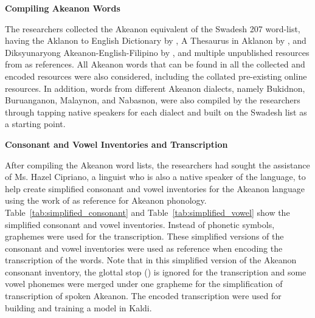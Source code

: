 \textbf{Compiling Akeanon Words}

The researchers collected the Akeanon equivalent of the Swadesh 207 word-list, having the Aklanon to English Dictionary by , A Thesaurus in Aklanon by , and Diksyunaryong Akeanon-English-Filipino by , and multiple unpublished resources from  as references. All Akeanon words that can be found in all the collected and encoded resources were also considered, including the collated pre-existing online resources. In addition, words from different Akeanon dialects, namely Bukidnon, Buruanganon, Malaynon, and Nabasnon, were also compiled by the researchers through tapping native speakers for each dialect and built on the Swadesh list as a starting point. 

\textbf{Consonant and Vowel Inventories and Transcription}

After compiling the Akeanon word lists, the researchers had sought the assistance of Ms. Hazel Cipriano, a linguist who is also a native speaker of the language, to help create simplified  consonant and vowel inventories for the Akeanon language using the work of  as reference for Akeanon phonology. Table~\ref{tab:simplified_consonant} and Table~\ref{tab:simplified_vowel} show the simplified consonant and vowel inventories. Instead of phonetic symbols, graphemes were used for the transcription. These simplified versions of the consonant and vowel inventories were used as reference when encoding the transcription of the words. Note that in this simplified version of the Akeanon consonant inventory, the glottal stop () is ignored for the transcription and some vowel phonemes were merged under one grapheme for the simplification of transcription of spoken Akeanon. The encoded transcription were used for building and training a model in Kaldi.


